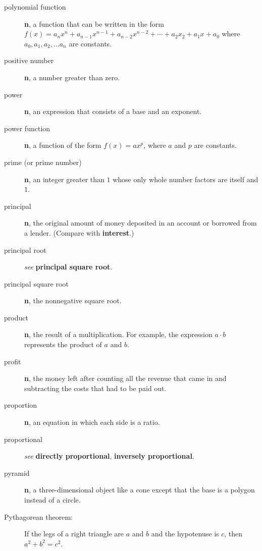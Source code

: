 \documentclass[10pt,]{book}
\newcommand{\terminology}[1]{\textbf{#1}}
\theoremstyle{plain}
\theoremstyle{definition}
\theoremstyle{definition}
\theoremstyle{definition}
\numberwithin{equation}{part}
\begin{document}
\begin{description}
\item[{polynomial function}]\hypertarget{li-725}{}\terminology{n}, a function that can be written in the form \(f (x) = a_nx^n + a_{n−1}x^{n−1} + a_{n−2}x^{n−2} +\cdots + a_2x_2 + a_1x + a_0\) where \(a_0, a_1, a_2, \ldots a_n\) are constants.%
\item[{positive number}]\hypertarget{li-726}{}\terminology{n}, a number greater than zero.%
\item[{power}]\hypertarget{li-727}{}\terminology{n}, an expression that consists of a base and an exponent.%
\item[{power function}]\hypertarget{li-728}{}\terminology{n}, a function of the form \(f(x) = ax^p\), where \(a\) and \(p\) are constants.%
\item[{prime (or prime number)}]\hypertarget{li-729}{}\terminology{n}, an integer greater than \(1\) whose only whole number factors are itself and \(1\).%
\item[{principal}]\hypertarget{li-730}{}\terminology{n}, the original amount of money deposited in an account or borrowed from a lender. (Compare with \terminology{interest}.)%
\item[{principal root}]\hypertarget{li-731}{}\emph{see} \terminology{principal square root}.%
\item[{principal square root}]\hypertarget{li-732}{}\terminology{n}, the nonnegative square root.%
\item[{product}]\hypertarget{li-733}{}\terminology{n}, the result of a multiplication. For example, the expression \(a\cdot b\) represents the product of \(a\) and \(b\).%
\item[{profit}]\hypertarget{li-734}{}\terminology{n}, the money left after counting all the revenue that came in and subtracting the costs that had to be paid out.%
\item[{proportion}]\hypertarget{li-735}{}\terminology{n}, an equation in which each side is a ratio.%
\item[{proportional}]\hypertarget{li-736}{}\emph{see} \terminology{directly proportional}, \terminology{inversely proportional}.%
\item[{pyramid}]\hypertarget{li-737}{}\terminology{n}, a three-dimensional object like a cone except that the base is a polygon instead of a circle.%
\item[{Pythagorean theorem:}]\hypertarget{li-738}{}If the legs of a right triangle are \(a\) and \(b\) and the hypotenuse is \(c\), then \(a^2 + b^2 = c^2\).%
\end{description}
%
\typeout{************************************************}
\typeout{************************************************}
\end{document}

